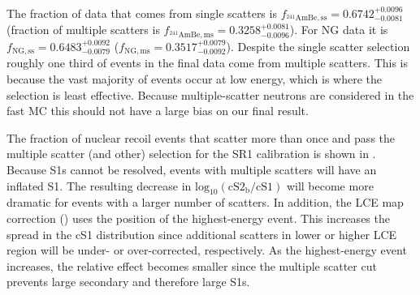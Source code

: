 The fraction of \ambe data that comes from single scatters is $f_{\mathrm{^{241}AmBe, ss}} = 0.6742_{-0.0081}^{+0.0096}$
(fraction of multiple scatters is $f_{\mathrm{^{241}AmBe, ms}} = 0.3258_{-0.0096}^{+0.0081}$).  For NG data it is
$f_{\mathrm{NG, ss}} = 0.6483_{-0.0079}^{+0.0092}$ ($f_{\mathrm{NG, ms}} = 0.3517_{-0.0092}^{+0.0079}$).  Despite the single scatter
selection
roughly one third of events in the final data come from multiple scatters.  This is because the vast majority of events occur at low energy,
which is where the selection is least effective.  Because multiple-scatter neutrons are considered in the fast MC this should not have a
large bias on our final result.

The fraction of nuclear recoil events that scatter more than once and pass the multiple scatter (and other) selection for the SR1 \ambe
calibration is shown in
.  Because S1s cannot be resolved, events with multiple scatters will have an
inflated S1.  The resulting decrease in $\mathrm{log}_{10}(\mathrm{cS2_b / cS1})$ will become more dramatic for events with a
larger number of scatters.  In addition, the LCE map correction
() uses the position of the highest-energy event.  This
increases the spread in the cS1 distribution since additional scatters in lower or higher LCE region will be under- or over-corrected,
respectively.  As the highest-energy event increases, the relative effect becomes smaller since the multiple scatter cut prevents large
secondary \stwob and therefore large S1s.

